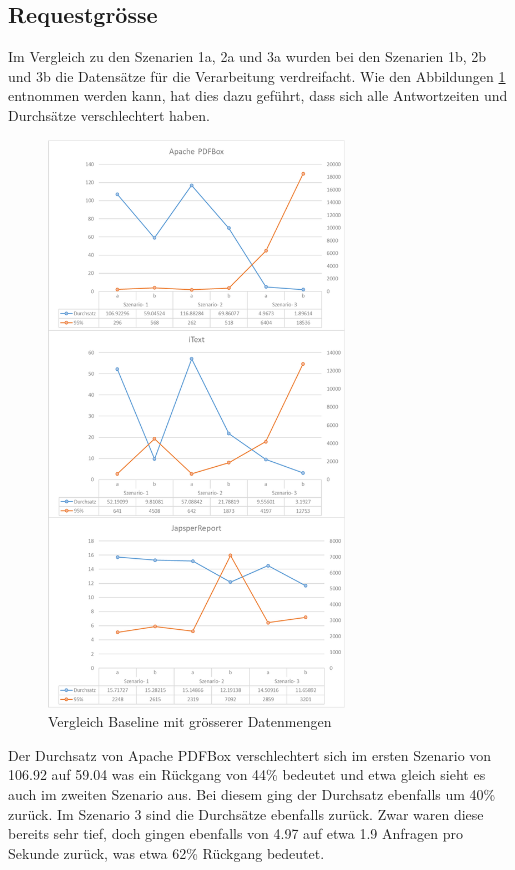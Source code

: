 \documentclass[main.tex]{subfiles}
\begin{document}
\subsection{Requestgrösse}
Im Vergleich zu den Szenarien 1a, 2a und 3a wurden bei den Szenarien 1b, 2b und 3b die Datensätze für die Verarbeitung verdreifacht. Wie den Abbildungen \ref{figure:vglABRequ} entnommen werden kann, hat dies dazu geführt, dass sich alle Antwortzeiten und Durchsätze verschlechtert haben.

\begin{figure}[H]
\centering
\includegraphics[width=0.7\textwidth]{mainpart/4_analyse_img/ABAuswertung.png}
 \caption{Vergleich Baseline mit grösserer Datenmengen}
 \label{figure:vglABRequ}
\end{figure}


Der Durchsatz von Apache PDFBox verschlechtert sich im ersten Szenario von 106.92 auf 59.04 was ein Rückgang von 44\% bedeutet und etwa gleich sieht es auch im zweiten Szenario aus. Bei diesem ging der Durchsatz ebenfalls um 40\% zurück. Im Szenario 3 sind die Durchsätze ebenfalls zurück. Zwar waren diese bereits sehr tief, doch gingen ebenfalls von 4.97 auf etwa 1.9 Anfragen pro Sekunde zurück, was etwa 62\% Rückgang bedeutet. 
\end{document}
